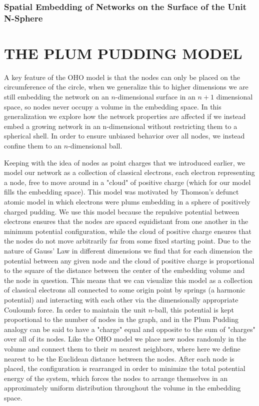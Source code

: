 \documentclass[aps,pre,reprint,superscriptaddress,amsmath,amssymb]{revtex4-1}
\begin{document}
\subsubsection{Spatial Embedding of Networks on the Surface of the Unit N-Sphere}

\section{THE PLUM PUDDING MODEL}
A key feature of the OHO model is that the nodes can only be placed on the circumference of the circle, when we generalize this to higher dimensions we are still embedding the network on an $n$-dimensional surface in an $n+1$ dimensional space, so nodes never occupy a volume in the embedding space.
In this generalization we explore how the network properties are affected if we instead embed a growing network in an n-dimensional without restricting them to a spherical shell.  In order to ensure unbiased behavior over all nodes, we instead confine them to an $n$-dimensional ball. 

Keeping with the idea of nodes as point charges that we introduced earlier, we model our network as a collection of classical electrons, each electron representing a node, free to move around in a "cloud" of positive charge (which for our model fills the embedding space).
This model was motivated by Thomson's defunct atomic model in which electrons were plums embedding in a sphere of positively charged pudding.
We use this model because the repulsive potential between electrons ensures that the nodes are spaced equidistant from one another in the minimum potential configuration, while the cloud of positive charge ensures that the nodes do not move arbitrarily far from some fixed starting point.
Due to the nature of Gauss' Law in different dimensions we find that for each dimension the potential between any given node and the cloud of positive charge is proportional to the square of the distance between the center of the embedding volume and the node in question.
This means that we can visualize this model as a collection of classical electrons all connected to some origin point by springs (a harmonic potential) and interacting with each other via the dimensionally appropriate Couloumb force.  In order to maintain the unit $n$-ball, this potential is kept proportional to the number of nodes in the graph, and in the Plum Pudding analogy can be said to have a "charge" equal and opposite to the sum of "charges" over all of its nodes.
Like the OHO model we place new nodes randomly in the volume and connect them to their $m$ nearest neighbors, where here we define nearest to be the Euclidean distance between the nodes.
After each node is placed, the configuration is rearranged in order to minimize the total potential energy of the system, which forces the nodes to arrange themselves in an approximately uniform distribution throughout the volume in the embedding space.
\end{document}
